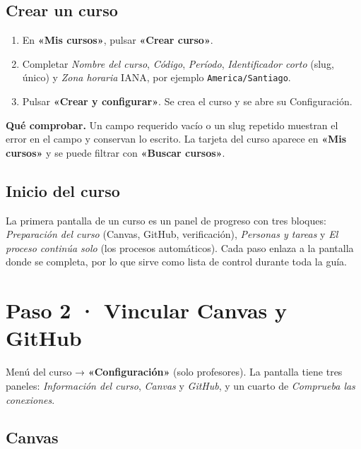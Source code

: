 \documentclass[11pt,a4paper]{article}
\newenvironment{comprobar}
  {\def\FrameCommand{\fcolorbox{verde}{verdefondo}}\MakeFramed{\advance\hsize-\width\FrameRestore}\noindent\textbf{\textcolor{verde}{Qué comprobar.}} }
  {\endMakeFramed}
\newcommand{\ui}[1]{\textbf{«#1»}}        %
\begin{document}
\subsection{Crear un curso}

\begin{enumerate}
  \item En \ui{Mis cursos}, pulsar \ui{Crear curso}.
  \item Completar \emph{Nombre del curso}, \emph{Código}, \emph{Período}, \emph{Identificador corto} (slug, único) y \emph{Zona horaria} IANA, por ejemplo \texttt{America/Santiago}.
  \item Pulsar \ui{Crear y configurar}. Se crea el curso y se abre su Configuración.
\end{enumerate}

\begin{comprobar}
Un campo requerido vacío o un slug repetido muestran el error en el campo y conservan lo escrito. La tarjeta del curso aparece en \ui{Mis cursos} y se puede filtrar con \ui{Buscar cursos}.
\end{comprobar}

\subsection{Inicio del curso}

La primera pantalla de un curso es un panel de progreso con tres bloques: \emph{Preparación del curso} (Canvas, GitHub, verificación), \emph{Personas y tareas} y \emph{El proceso continúa solo} (los procesos automáticos). Cada paso enlaza a la pantalla donde se completa, por lo que sirve como lista de control durante toda la guía.

\section{Paso 2 · Vincular Canvas y GitHub}

Menú del curso → \ui{Configuración} (solo profesores). La pantalla tiene tres paneles: \emph{Información del curso}, \emph{Canvas} y \emph{GitHub}, y un cuarto de \emph{Comprueba las conexiones}.

\subsection{Canvas}
\end{document}
